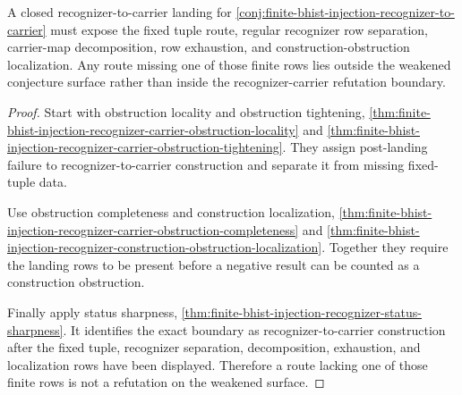 \begin{theorem}
\label{thm:finite-bhist-injection-recognizer-carrier-refutation-boundary}
A closed recognizer-to-carrier landing for \autoref{conj:finite-bhist-injection-recognizer-to-carrier} must expose the fixed tuple route, regular recognizer row separation, carrier-map decomposition, row exhaustion, and construction-obstruction localization. Any route missing one of those finite rows lies outside the weakened conjecture surface rather than inside the recognizer-carrier refutation boundary.
\end{theorem}
\begin{proof}
Start with obstruction locality and obstruction tightening, \autoref{thm:finite-bhist-injection-recognizer-carrier-obstruction-locality} and \autoref{thm:finite-bhist-injection-recognizer-carrier-obstruction-tightening}. They assign post-landing failure to recognizer-to-carrier construction and separate it from missing fixed-tuple data.

Use obstruction completeness and construction localization, \autoref{thm:finite-bhist-injection-recognizer-carrier-obstruction-completeness} and \autoref{thm:finite-bhist-injection-recognizer-construction-obstruction-localization}. Together they require the landing rows to be present before a negative result can be counted as a construction obstruction.

Finally apply status sharpness, \autoref{thm:finite-bhist-injection-recognizer-status-sharpness}. It identifies the exact boundary as recognizer-to-carrier construction after the fixed tuple, recognizer separation, decomposition, exhaustion, and localization rows have been displayed. Therefore a route lacking one of those finite rows is not a refutation on the weakened surface.
\end{proof}

